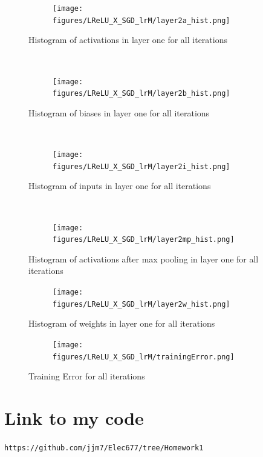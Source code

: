 \documentclass[]{article}
\newcommand{\code}[1]{\texttt{#1}}
\begin{document}
\begin{figure}[ht]
    \centering
    \begin{subfigure}
        \centering
        \texttt{[image: figures/LReLU\_X\_SGD\_lrM/layer2a\_hist.png]}
    \end{subfigure}%
    \caption{Histogram of activations in layer one for all iterations}
 \label{fig:/layer2a_hist2}
    ~ 
    \centering
    \begin{subfigure}
        \centering
        \texttt{[image: figures/LReLU\_X\_SGD\_lrM/layer2b\_hist.png]}
    \end{subfigure}%
    \caption{Histogram of biases in  layer one for all iterations}
 \label{fig:/layer2b_hist2}
    ~ 
    \centering
    \begin{subfigure}
        \centering
        \texttt{[image: figures/LReLU\_X\_SGD\_lrM/layer2i\_hist.png]}
    \end{subfigure}%
    \caption{Histogram of  inputs in  layer one for all iterations}
 \label{fig:/layer2i_hist2}
    ~ 
    \centering
    \begin{subfigure}
        \centering
        \texttt{[image: figures/LReLU\_X\_SGD\_lrM/layer2mp\_hist.png]}
    \end{subfigure}%
    \caption{Histogram of activations after max pooling in  layer one for all iterations}
 \label{fig:/layer2mp_hist2}
\end{figure}

\begin{figure}
    \centering
    \begin{subfigure}
        \centering
        \texttt{[image: figures/LReLU\_X\_SGD\_lrM/layer2w\_hist.png]}
    \end{subfigure}%
    \caption{Histogram of weights in layer one for all iterations}
 \label{fig:/layer2w_hist2}
\end{figure}

\begin{figure}
    \centering
    \begin{subfigure}
        \centering
        \texttt{[image: figures/LReLU\_X\_SGD\_lrM/trainingError.png]}
    \end{subfigure}%
    \caption{Training Error for all iterations}
 \label{fig:trainError2}
\end{figure}

\section{Link to my code}
\code{https://github.com/jjm7/Elec677/tree/Homework1}
\end{document}
